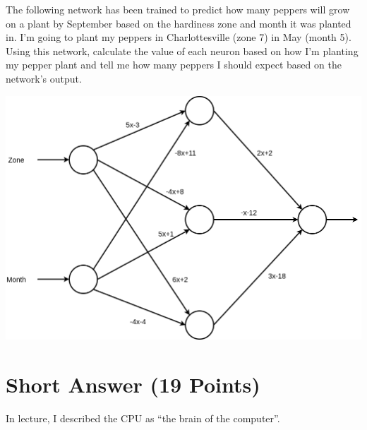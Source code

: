 \documentclass{exam}
\begin{document}
\begin{questions}
\newpage
\question[5] The following network has been trained to predict how many peppers will grow on a plant by September based on the hardiness zone and month it was planted in. I'm going to plant my peppers in Charlottesville (zone 7) in May (month 5). Using this network, calculate the value of each neuron based on how I'm planting my pepper plant and tell me how many peppers I should expect based on the network's output.

\includegraphics[width=\linewidth]{network.png}

\newpage

\section{Short Answer (19 Points)}
\question In lecture, I described the CPU as ``the brain of the computer''. 

\vspace{2in}


\end{questions}
\end{document}
